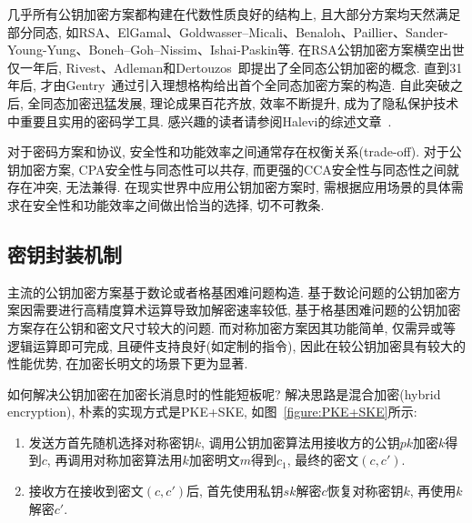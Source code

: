 \begin{note}
几乎所有公钥加密方案都构建在代数性质良好的结构上, 且大部分方案均天然满足部分同态, 
如RSA、ElGamal、Goldwasser–Micali、Benaloh、Paillier、Sander-Young-Yung、Boneh–Goh–Nissim、Ishai-Paskin等. 
在RSA公钥加密方案横空出世仅一年后, Rivest、Adleman和Dertouzos~\cite{RAD-FOSC-1978}即提出了全同态公钥加密的概念. 
直到31年后, 才由Gentry~\cite{Gentry-STOC-2009}通过引入理想格构给出首个全同态加密方案的构造. 
自此突破之后, 全同态加密迅猛发展, 理论成果百花齐放, 效率不断提升, 成为了隐私保护技术中重要且实用的密码学工具. 
感兴趣的读者请参阅Halevi的综述文章~\cite{Halevi-Tutorial-2017}.
\end{note}

\begin{remark}
对于密码方案和协议, 安全性和功能效率之间通常存在权衡关系(trade-off). 
对于公钥加密方案, CPA安全性与同态性可以共存, 而更强的CCA安全性与同态性之间就存在冲突, 无法兼得. 
在现实世界中应用公钥加密方案时, 需根据应用场景的具体需求在安全性和功能效率之间做出恰当的选择, 切不可教条. 
\end{remark}


\begin{center}
\end{center}


\subsection{密钥封装机制}\label{subsec:KEM}
主流的公钥加密方案基于数论或者格基困难问题构造. 
基于数论问题的公钥加密方案因需要进行高精度算术运算导致加解密速率较低, 基于格基困难问题的公钥加密方案存在公钥和密文尺寸较大的问题. 
而对称加密方案因其功能简单, 仅需异或等逻辑运算即可完成, 且硬件支持良好(如定制的指令), 
因此在较公钥加密具有较大的性能优势, 在加密长明文的场景下更为显著. 

如何解决公钥加密在加密长消息时的性能短板呢? 解决思路是混合加密(hybrid encryption), 
朴素的实现方式是PKE+SKE, 如图~\ref{figure:PKE+SKE}所示: 
\begin{enumerate}
\item 发送方首先随机选择对称密钥$k$, 调用公钥加密算法用接收方的公钥$pk$加密$k$得到$c$, 
	再调用对称加密算法用$k$加密明文$m$得到$c_1$, 最终的密文$(c, c')$. 

\item 接收方在接收到密文$(c, c')$后, 首先使用私钥$sk$解密$c$恢复对称密钥$k$, 再使用$k$解密$c'$. 
\end{enumerate}     


